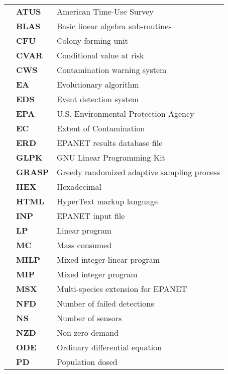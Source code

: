 \begin{tabularx}{\textwidth}{p{0.5in}lX}
&\bf ATUS & American Time-Use Survey \\
&\bf BLAS & Basic linear algebra sub-routines \\
&\bf CFU & Colony-forming unit \\
&\bf CVAR & Conditional value at risk \\
&\bf CWS & Contamination warning system \\
&\bf EA & Evolutionary algorithm \\
&\bf EDS & Event detection system \\
&\bf EPA & U.S. Environmental Protection Agency \\
&\bf EC & Extent of Contamination \\
&\bf ERD & EPANET results database file \\
&\bf GLPK & GNU Linear Programming Kit \\
&\bf GRASP & Greedy randomized adaptive sampling process \\
&\bf HEX & Hexadecimal \\
&\bf HTML & HyperText markup language \\
&\bf INP & EPANET input file \\
&\bf LP & Linear program \\
&\bf MC & Mass consumed  \\
&\bf MILP & Mixed integer linear program \\
&\bf MIP & Mixed integer program \\
&\bf MSX & Multi-species extension for EPANET   \\
&\bf NFD & Number of failed detections  \\
&\bf NS & Number of sensors \\
&\bf NZD & Non-zero demand \\
&\bf ODE & Ordinary differential equation \\
&\bf PD & Population dosed \\

\end{tabularx}
